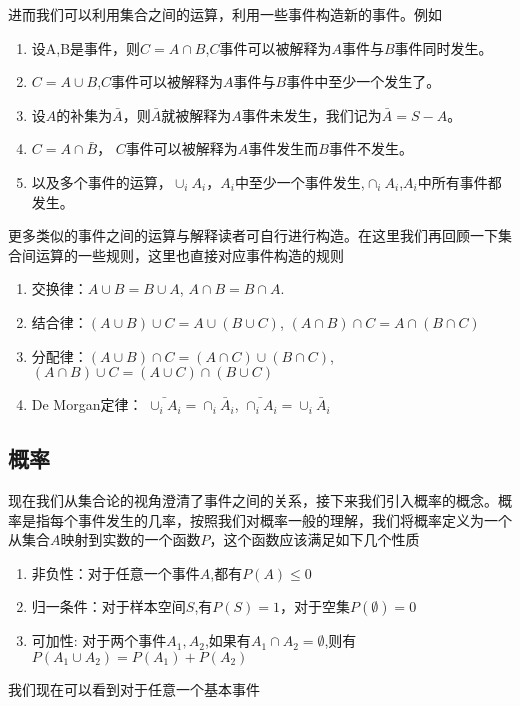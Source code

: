 进而我们可以利用集合之间的运算，利用一些事件构造新的事件。例如
\begin{enumerate}
\item 设A,B是事件，则$C = A \cap B$,$C$事件可以被解释为$A$事件与$B$事件同时发生。
\item $C = A \cup B$,$C$事件可以被解释为$A$事件与$B$事件中至少一个发生了。
\item 设$A$的补集为$\bar{A}$，则$\bar{A}$就被解释为$A$事件未发生，我们记为$\bar{A}=S-A$。
\item $C = A \cap \bar{B}$， $C$事件可以被解释为$A$事件发生而$B$事件不发生。
\item 以及多个事件的运算，$\cup_i A_i$，$A_i$中至少一个事件发生,$\cap_i A_i$,$A_i$中所有事件都发生。
\end{enumerate}
更多类似的事件之间的运算与解释读者可自行进行构造。在这里我们再回顾一下集合间运算的一些规则，这里也直接对应事件构造的规则
\begin{enumerate}
\item 交换律：$A \cup B = B \cup A$, $A \cap B = B \cap A$.
\item 结合律：$(A \cup B)\cup C = A \cup (B \cup C)$, $(A \cap B)\cap C = A \cap (B\cap C)$
\item 分配律：$(A\cup B)\cap C = (A \cap C) \cup (B \cap C)$, $(A\cap B) \cup C = (A \cup C)\cap (B \cup C)$
\item De Morgan定律： $\bar{\cup_i A_i} = \cap_i \bar{A}_i$, $\bar{\cap_i A_i} = \cup_i \bar{A}_i$
\end{enumerate}
\subsection{概率}
现在我们从集合论的视角澄清了事件之间的关系，接下来我们引入概率的概念。概率是指每个事件发生的几率，按照我们对概率一般的理解，我们将概率定义为一个从集合$A$映射到实数的一个函数$P$，这个函数应该满足如下几个性质
\begin{enumerate}
\item 非负性：对于任意一个事件$A$,都有$P(A)\leq 0$
\item 归一条件：对于样本空间$S$,有$P(S) = 1$，对于空集$P(\emptyset) = 0$
\item 可加性: 对于两个事件$A_1,A_2$,如果有$A_1 \cap A_2 = \emptyset$,则有 $P(A_1 \cup A_2) = P(A_1)+P(A_2)$
\end{enumerate}
我们现在可以看到对于任意一个基本事件

